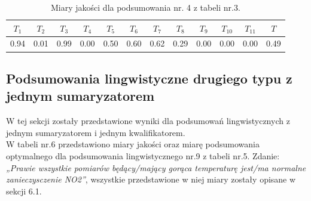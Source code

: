 \documentclass{article}
\begin{document}
\begin{table}[H]
    \centering
    \begin{tabular}{|c|c|c|c|c|c|c|c|c|c|c|c|}
    \hline
    \textbf{\(T_1\)} &\textbf{\(T_2\)} & \textbf{\(T_3\)} & \textbf{\(T_4\)} & \textbf{\(T_5\)} & \textbf{\(T_6\)} & \textbf{\(T_7\)} & \textbf{\(T_8\)} & \textbf{\(T_9\)} & \textbf{\(T_{10}\)} & \textbf{\(T_{11}\)} & \textbf{\(T\)} \\ \hline
    0.94 & 0.01 & 0.99 & 0.00 & 0.50 & 0.60 & 0.62 & 0.29 & 0.00 & 0.00 & 0.00 & 0.49 \\ \hline
    \end{tabular}
    \caption{Miary jakości dla podsumowania nr. 4 z tabeli nr.3.}
\end{table}  


\subsection{Podsumowania lingwistyczne drugiego typu z jednym sumaryzatorem}
W tej sekcji zostały przedstawione wyniki dla podsumowań lingwistycznych z jednym sumaryzatorem i jednym kwalifikatorem.\\
W tabeli nr.6 przedstawiono miary jakości oraz miarę podsumowania optymalnego dla podsumowania lingwistycznego nr.9 z tabeli nr.5. Zdanie: \textit{„Prawie wszystkie pomiarów będący/mający gorąca temperaturę jest/ma normalne zanieczysczenie NO2”}, wszystkie przedstawione w niej miary zostały opisane w sekcji 6.1. 
\end{document}
